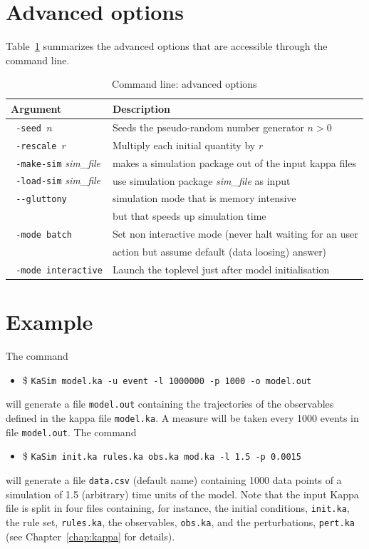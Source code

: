 \documentclass[11pt]{book}
\def\ttt#1{\texttt{#1}}
\def\ITE#1{\begin{itemize}#1\end{itemize}}
\def\dd{-\hspace{0.001cm}-}
\begin{document}
\section{Advanced options}

Table~\ref{tab:add-options} summarizes the advanced options that are accessible through the command line.

\begin{table}[h!]
\caption{Command line: advanced options}
\centering
\begin{tabular}{|l|l|}
\hline
Argument & Description \\ \hline
\ttt{ -seed $n$} & Seeds the pseudo-random number generator $n>0$ \\
\ttt{ -rescale $r$} & Multiply each initial quantity by $r$ \\
\ttt{ -make-sim} \textit{sim\_file} & makes a simulation package out of the input kappa files \\
\ttt{ -load-sim} \textit{sim\_file} & use simulation package \textit{sim\_file} as input\\
\ttt{ \dd gluttony} & simulation mode that is memory intensive \\ & but that speeds up simulation time\\
\ttt{ -mode batch} & Set non interactive mode (never halt waiting for an user\\
& action but assume default (data loosing) answer)\\
\ttt{ -mode interactive} & Launch the toplevel just after model initialisation\\
\hline
\end{tabular}
\label{tab:add-options}
\end{table}%
%

\section{Example}
The command
\ITE{
\item[\$] \ttt{KaSim model.ka -u event -l 1000000 -p 1000 -o model.out}
}
will generate a file \ttt{model.out} containing the trajectories of the observables defined in the kappa file \ttt{model.ka}. A measure will be taken every 1000 events in file \ttt{model.out}. The command
\ITE{
\item[\$] \ttt{KaSim init.ka rules.ka obs.ka mod.ka -l 1.5 -p 0.0015}
}
will generate a file \ttt{data.csv} (default name) containing 1000 data points of a simulation of 1.5 (arbitrary) time units of the model. Note that the input Kappa file is split in four files containing, for instance, the initial conditions, \ttt{init.ka}, the rule set, \ttt{rules.ka}, the observables, \ttt{obs.ka}, and the perturbations, \ttt{pert.ka} (see Chapter~\ref{chap:kappa} for details). %
\end{document}
